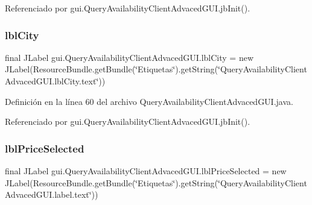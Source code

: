 Referenciado por gui.\+Query\+Availability\+Client\+Advaced\+G\+U\+I.\+jb\+Init().

\mbox{\label{classgui_1_1_query_availability_client_advaced_g_u_i_acd2c162465aa814c6fad17b36d0e3d47}} 
\subsubsection{\texorpdfstring{lblCity}{lblCity}}
{\footnotesize\ttfamily final J\+Label gui.\+Query\+Availability\+Client\+Advaced\+G\+U\+I.\+lbl\+City = new J\+Label(Resource\+Bundle.\+get\+Bundle(\char`\"{}Etiquetas\char`\"{}).get\+String(\char`\"{}Query\+Availability\+Client\+Advaced\+G\+U\+I.\+lbl\+City.\+text\char`\"{}))\hspace{0.3cm}{\ttfamily [private]}}



Definición en la línea 60 del archivo Query\+Availability\+Client\+Advaced\+G\+U\+I.\+java.



Referenciado por gui.\+Query\+Availability\+Client\+Advaced\+G\+U\+I.\+jb\+Init().

\mbox{\label{classgui_1_1_query_availability_client_advaced_g_u_i_a8f3d9f21b9a743c3307e3d329943df48}} 
\subsubsection{\texorpdfstring{lblPriceSelected}{lblPriceSelected}}
{\footnotesize\ttfamily final J\+Label gui.\+Query\+Availability\+Client\+Advaced\+G\+U\+I.\+lbl\+Price\+Selected = new J\+Label(Resource\+Bundle.\+get\+Bundle(\char`\"{}Etiquetas\char`\"{}).get\+String(\char`\"{}Query\+Availability\+Client\+Advaced\+G\+U\+I.\+label.\+text\char`\"{}))\hspace{0.3cm}{\ttfamily [private]}}



